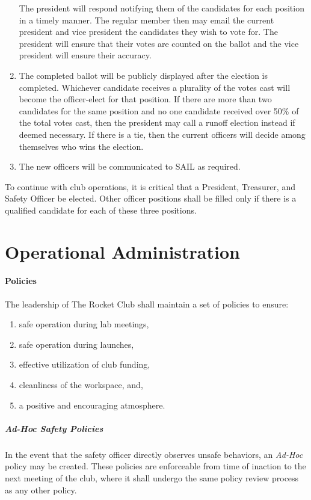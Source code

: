 \documentclass[12pt]{article}
\begin{document}
\begin{enumerate}[label=(\roman*)]
    The president will respond notifying them of the candidates for each position in a timely manner. 
    The regular member then may email the current president and vice president the candidates they wish to vote for. 
    The president will ensure that their votes are counted on the ballot and the vice president will ensure their accuracy.
    \item The completed ballot will be publicly displayed after the election is completed. 
    Whichever candidate receives a plurality of the votes cast will become the officer-elect for that position. 
    If there are more than two candidates for the same position and no one candidate received over 50\% of the total votes cast, 
    then the president may call a runoff election instead if deemed necessary. 
    If there is a tie, then the current officers will decide among themselves who wins the election.
    \item The new officers will be communicated to SAIL as required.
\end{enumerate}
To continue with club operations, it is critical that a President, Treasurer, and Safety Officer be elected. 
Other officer positions shall be filled only if there is a qualified candidate for each of these three positions.

\section{Operational Administration}
{
    \paragraph{Policies}
    The leadership of The Rocket Club shall maintain a set of policies to ensure:
    \begin{enumerate}[label=(\roman*)]
        \item safe operation during lab meetings,
        \item safe operation during launches,
        \item effective utilization of club funding,
        \item cleanliness of the workspace, and,
        \item a positive and encouraging atmosphere.
    \end{enumerate}
    {
    \subparagraph{{\it \bf Ad-Hoc} Safety Policies}
    In the event that the safety officer directly observes unsafe behaviors, an {\it Ad-Hoc} policy may be created.
    These policies are enforceable from time of inaction to the next meeting of the club, 
    where it shall undergo the same policy review process as any other policy.
    }
}
\end{document}
